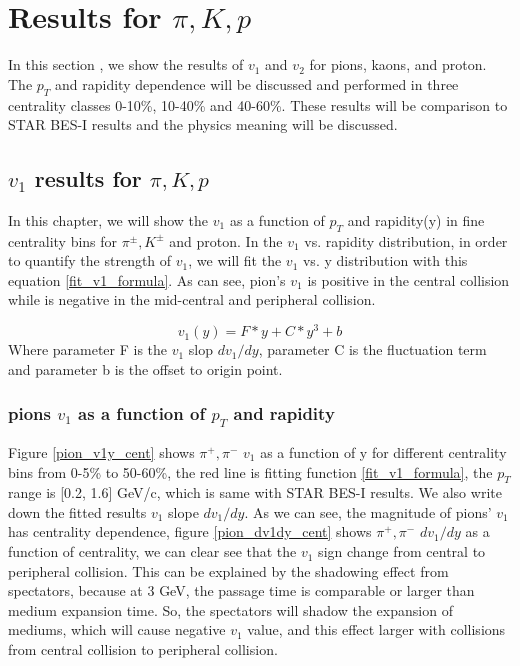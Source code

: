 \section{Results for $\pi, K, p$} 
In this section
, we show the results of $v_{1}$ and $v_{2}$ for pions, kaons, and proton. The $p_{T}$ and rapidity dependence will be discussed and performed in three centrality classes 0-10\%, 10-40\% and 40-60\%. These results will be comparison to STAR BES-I results and the physics meaning will be discussed.

\subsection{$v_{1}$ results for $\pi, K, p$}
In this chapter, we will show the $v_{1}$ as a function of $p_{T}$ and rapidity(y) in fine centrality bins for $\pi^{\pm}, K^{\pm}$ and proton. In the $v_{1}$  vs. rapidity distribution, in order to quantify the strength of  $v_{1}$, we will fit the $v_{1}$ vs. y distribution with this equation \ref{fit_v1_formula}. As can see, pion's $v_{1}$ is positive in the central collision while is negative in the mid-central and peripheral collision.

\begin{equation} \label{fit_v1_formula}
	v_{1}(y) = F*y + C*y^{3} +b 
\end{equation}
Where parameter F is the $v_{1}$ slop $dv_{1}/dy$, parameter C is the fluctuation term and parameter b is the offset to origin point.

\subsubsection{pions $v_{1}$ as a function of $p_{T}$ and rapidity}
Figure \ref{pion_v1y_cent} shows $\pi^{+}, \pi^{-}$ $v_{1}$ as a function of y for different centrality bins from 0-5\% to 50-60\%,  the red line is fitting function \ref{fit_v1_formula}, the $p_{T}$ range is [0.2, 1.6] GeV/c, which is same with STAR BES-I results. We also write down the fitted results $v_{1}$ slope $dv_{1}/dy$. As we can see, the magnitude of pions' $v_{1}$ has centrality dependence, figure \ref{pion_dv1dy_cent} shows $\pi^{+}, \pi^{-}$ $dv_{1}/dy$ as a function of centrality, we can clear see that the $v_{1}$ sign change from central to peripheral collision. This can be explained by the shadowing effect from spectators, because at 3 GeV, the passage time is comparable or larger than medium expansion time. So, the spectators will shadow the expansion of mediums, which will cause negative $v_{1}$ value, and this effect larger with collisions from central collision to peripheral collision.

